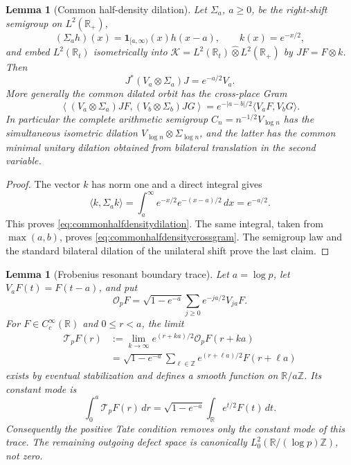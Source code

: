 \documentclass[11pt]{amsart}
\newtheorem{lemma}[theorem]{Lemma}
\theoremstyle{definition}
\theoremstyle{remark}
\begin{document}
\begin{lemma}[Common half-density dilation]\label{lem:commonhalfdensitydilation}
Let $\Sigma_a$, $a\ge0$, be the right-shift semigroup on
\(L^2(\mathbb R_+)\),
\[
 (\Sigma_ah)(x)=\mathbf 1_{[a,\infty)}(x)h(x-a),
 \qquad k(x)=e^{-x/2},
\]
and embed $L^2(\mathbb R_t)$ isometrically into
\(\mathcal K=L^2(\mathbb R_t)\widehat\otimes L^2(\mathbb R_+)\) by
\(JF=F\otimes k\).  Then
\begin{equation}\label{eq:commonhalfdensitydilation}
 J^*(V_a\otimes \Sigma_a)J=e^{-a/2}V_a.
\end{equation}
More generally the common dilated orbit has the cross-place Gram
\begin{equation}\label{eq:commonhalfdensitycrossgram}
 \left\langle(V_a\otimes \Sigma_a)JF,(V_b\otimes \Sigma_b)JG\right\rangle
 =e^{-|a-b|/2}\langle V_aF,V_bG\rangle.
\end{equation}
In particular the complete arithmetic semigroup
\(C_n=n^{-1/2}V_{\log n}\) has the simultaneous isometric dilation
\(V_{\log n}\otimes \Sigma_{\log n}\), and the latter has the common minimal
unitary dilation obtained from bilateral translation in the second variable.
\end{lemma}

\begin{proof}
The vector $k$ has norm one and a direct integral gives
\[
 \langle k,\Sigma_ak\rangle
 =\int_a^\infty e^{-x/2}e^{-(x-a)/2}\,dx=e^{-a/2}.
\]
This proves \eqref{eq:commonhalfdensitydilation}.  The same integral, taken
from \(\max(a,b)\), proves \eqref{eq:commonhalfdensitycrossgram}.  The
semigroup law and the standard bilateral dilation of the unilateral shift prove the last claim.
\end{proof}

\begin{lemma}[Frobenius resonant boundary trace]
\label{lem:frobeniusresonanttrace}
Let $a=\log p$, let $V_aF(t)=F(t-a)$, and put
\[
 \mathcal O_pF=\sqrt{1-e^{-a}}
   \sum_{j\ge0}e^{-ja/2}V_{ja}F.
\]
For $F\in C_c^\infty(\mathbb R)$ and $0\le r<a$, the limit
\begin{equation}\label{eq:frobeniusresonanttrace}
 \begin{split}
 \mathcal T_pF(r)
 &:=\lim_{k\to\infty}e^{(r+ka)/2}
             \mathcal O_pF(r+ka)\\
 &=\sqrt{1-e^{-a}}\sum_{\ell\in\mathbb Z}
       e^{(r+\ell a)/2}F(r+\ell a)
 \end{split}
\end{equation}
exists by eventual stabilization and defines a smooth function on
$\mathbb R/a\mathbb Z$.  Its constant mode is
\begin{equation}\label{eq:frobeniusresonantmean}
 \int_0^a\mathcal T_pF(r)\,dr
 =\sqrt{1-e^{-a}}\int_{\mathbb R}e^{t/2}F(t)\,dt.
\end{equation}
Consequently the positive Tate condition removes only the constant mode of
this trace.  The remaining outgoing defect space is canonically
$L^2_0(\mathbb R/(\log p)\mathbb Z)$, not zero.
\end{lemma}
\end{document}
